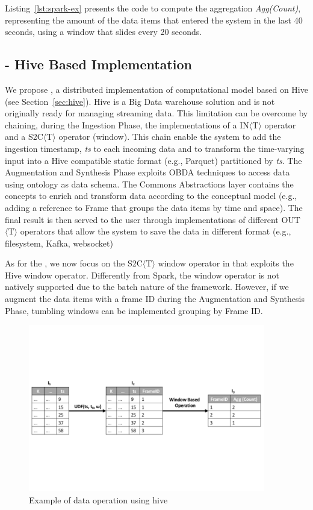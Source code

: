 {Listing~\ref{lst:spark-ex} presents the code to compute the aggregation \textit{Agg(Count)}, representing the amount of the data items that entered the system in the last 40 seconds, using a window that slides every 20 seconds.

\subsection{\protect\hivedi{} - Hive Based Implementation} \label{sec:comp-mod-impl-h-hive}
We propose \hivedi{}, a distributed implementation of \river{} computational model based on Hive (see Section~\ref{sec:hive}).
Hive is a Big Data warehouse solution and is not originally ready for managing streaming data.
This limitation can be overcome by chaining, during the Ingestion Phase, the implementations of a IN$\langle\mathrm{T}\rangle$ operator and a S2C$\langle\mathrm{T}\rangle$ operator (window). This chain enable the system to add the ingestion timestamp, \textit{ts} to each incoming data and to transform the time-varying input into a Hive compatible static format (e.g., Parquet) partitioned by \textit{ts}. 
The Augmentation and Synthesis Phase exploits OBDA techniques to access data using \frappe{} ontology as data schema.
The \frappe{} Commons Abstractions layer contains the concepts to enrich and transform data according to the \frappe{} conceptual model (e.g., adding a reference to \frappe{} Frame that groups the data items by time and space).
The final result is then served to the user through implementations of different OUT$\langle\mathrm{T}\rangle$ operators that allow the system to save the data in different format (e.g., filesystem, Kafka, websocket)  

As for the \sparkdi{}, we now focus on the S2C$\langle\mathrm{T}\rangle$ window operator in \hivedi{} that exploits the Hive window operator. Differently from Spark, the window operator is not natively supported due to the batch nature of the framework. However, if we augment the data items with a frame ID during the Augmentation and Synthesis Phase, tumbling windows can be implemented grouping by Frame ID. 

\begin{figure}[ht]
\centering
\includegraphics[width=0.92\textwidth]{img/hive_example}
\caption{Example of data operation using hive}
\label{fig:hive-ex}
\end{figure} 

}
